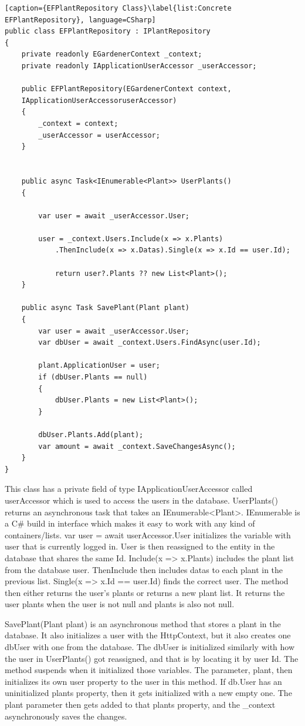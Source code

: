 \documentclass[a4paper,12pt,oneside,openright,titlepage]{book}
\begin{document}
\begin{lstlisting}[caption={EFPlantRepository Class}\label{list:Concrete EFPlantRepository}, language=CSharp]
public class EFPlantRepository : IPlantRepository
{
	private readonly EGardenerContext _context;
    private readonly IApplicationUserAccessor _userAccessor;

	public EFPlantRepository(EGardenerContext context,
	IApplicationUserAccessoruserAccessor)
	{
		_context = context;
        _userAccessor = userAccessor;
	}

        
	public async Task<IEnumerable<Plant>> UserPlants()
	{

		var user = await _userAccessor.User;
            
		user = _context.Users.Include(x => x.Plants)
			.ThenInclude(x => x.Datas).Single(x => x.Id == user.Id);
            
            return user?.Plants ?? new List<Plant>();
	}

	public async Task SavePlant(Plant plant)
	{
		var user = await _userAccessor.User;
		var dbUser = await _context.Users.FindAsync(user.Id);

		plant.ApplicationUser = user;
		if (dbUser.Plants == null)
		{
	        dbUser.Plants = new List<Plant>();
        }
            
        dbUser.Plants.Add(plant);
        var amount = await _context.SaveChangesAsync();
	}
}
\end{lstlisting}
This class has a private field of type IApplicationUserAccessor called userAccessor which is used to access the users in the database. UserPlants() returns an asynchronous task that takes an IEnumerable<Plant>. IEnumerable is a C\#  build in interface which makes it easy to work with any kind of containers/lists. var user = await userAccessor.User initializes the variable with user that is currently logged in. User is then reassigned to the entity in the database that shares the same Id. Include(x => x.Plants) includes the plant list from the database user. ThenInclude then includes datas to each plant in the previous list. Single(x => x.Id == user.Id) finds the correct user. The method then either returns the user's plants or returns a new plant list. It returns the user plants when the user is not null and plants is also not null.

SavePlant(Plant plant) is an asynchronous method that stores a plant in the database.  It also initializes a user with the HttpContext, but it also creates one dbUser with one from the database. The dbUser is initialized similarly with how the user in UserPlants() got reassigned, and that is by locating it by user Id. The method suspends when it initialized those variables. The parameter, plant, then initializes its own user property to the user in this method. If db.User has an uninitialized plants property, then it gets initialized with a new empty one. The plant parameter then gets added to that plants property, and the \_context asynchronously saves the changes.
  
\end{document}
